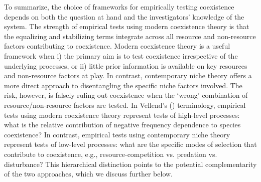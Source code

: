To summarize, the choice of frameworks for empirically testing coexistence depends on both the question at hand and the investigators' knowledge of the system. The strength of empirical tests using modern coexistence theory is that the equalizing and stabilizing terms integrate across all resource and non-resource factors contributing to coexistence. Modern coexistence theory is a useful framework when i) the primary aim is to test coexistence irrespective of the underlying processes, or ii) little prior information is available on key resources and non-resource factors at play. In contrast, contemporary niche theory offers a more direct approach to disentangling the specific niche factors involved. The risk, however, is falsely ruling out coexistence when the `wrong' combination of resource/non-resource factors are tested. In Vellend's (\citeyear{Vellend2016}) terminology, empirical tests using modern coexistence theory represent tests of high-level processes: what is the relative contribution of negative frequency dependence to species coexistence? In contrast, empirical tests using contemporary niche theory represent tests of low-level processes: what are the specific modes of selection that contribute to coexistence, e.g., resource-competition vs. predation vs. disturbance? This hierarchical distinction points to the potential complementarity of the two approaches, which we discuss further below. 
\par



